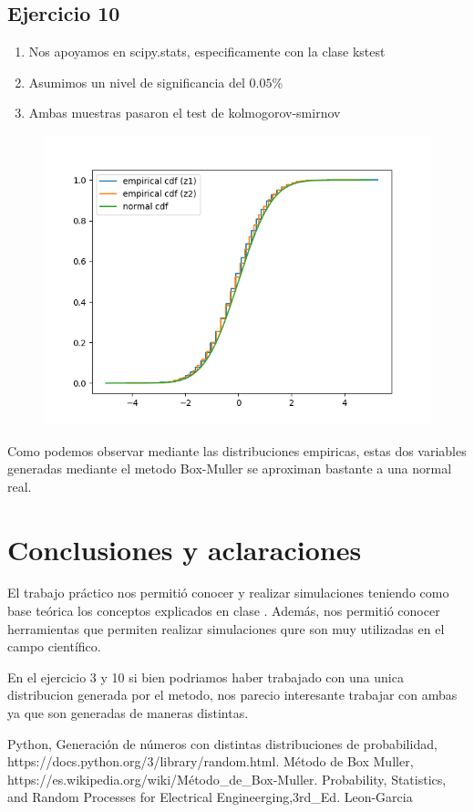 \documentclass[11pt,a4paper]{article}
\begin{document}
	\subsection{Ejercicio 10}
	\begin{enumerate}
		\item Nos apoyamos en scipy.stats, especificamente con la clase kstest
		\item Asumimos un nivel de significancia del $0.05$\%
		\item Ambas muestras pasaron el test de kolmogorov-smirnov
	\end{enumerate}
	\begin{figure}[H]
  		\centering
    		\includegraphics[width=14cm]{imagenes/10}
	\end{figure}
	Como podemos observar mediante las distribuciones empiricas, estas dos variables generadas mediante el metodo Box-Muller se aproximan bastante a una normal real.

\newpage
\section{Conclusiones y aclaraciones}
El trabajo práctico nos permitió conocer y realizar simulaciones teniendo como base teórica los conceptos explicados en clase . Además, nos permitió conocer herramientas que permiten realizar simulaciones qure son muy utilizadas en el campo científico.

En el ejercicio 3 y 10 si bien podriamos haber trabajado con una unica distribucion generada por el metodo, nos parecio interesante trabajar con ambas ya que son generadas de maneras distintas.
\begin{thebibliography}{10}
	\bibitem{} Python, Generación de números con distintas distribuciones de probabilidad, https://docs.python.org/3/library/random.html.
	\bibitem{} Método de Box Muller, https://es.wikipedia.org/wiki/Método\_de\_Box-Muller.
	\bibitem{} Probability, Statistics, and Random Processes for Electrical Engineerging,3rd\_Ed. Leon-Garcia
\end{thebibliography}
\end{document}
